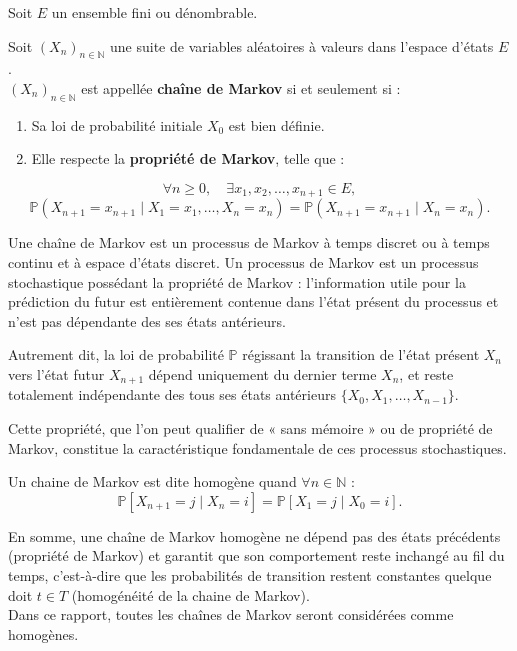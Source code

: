 \documentclass{article}
\begin{document}
\begin{tcolorbox}[colback=white,colframe=red!80!black,title=Chaîne de Markov]
Soit $E$ un ensemble fini ou dénombrable.

Soit $(X_n)_{n \in \mathbb{N}}$ une suite de variables aléatoires à valeurs dans l'espace d'états $E$. \\

$(X_n)_{n \in \mathbb{N}}$ est appellée \textbf{chaîne de Markov} si et seulement si :
\begin{enumerate}[leftmargin=5em, label=(\arabic*)]
    \item Sa loi de probabilité initiale $X_0$ est bien définie.
    \item Elle respecte la \textbf{propriété de Markov}, telle que :
\end{enumerate}
\[
\forall n \geq 0, \quad \exists x_1, x_2, \dots, x_{n+1} \in E,
\]
\[
\mathbb{P}(X_{n+1} = x_{n+1} \mid X_1 = x_1, \dots, X_n = x_n) = \mathbb{P}(X_{n+1} = x_{n+1} \mid X_n = x_n).
\]
\end{tcolorbox}

Une chaîne de Markov est un processus de Markov à temps discret ou à temps continu et à espace d'états discret. Un processus de Markov est un processus stochastique possédant la propriété de Markov : l'information utile pour la prédiction du futur est entièrement contenue dans l'état présent du processus et n'est pas dépendante des ses états antérieurs.

Autrement dit, la loi de probabilité $\mathbb{P}$ régissant la transition de l'état présent $X_n$ vers l'état futur $X_{n+1}$ dépend uniquement du dernier terme $X_n$, et reste totalement indépendante des tous ses états antérieurs $\{X_0, X_1, \dots, X_{n-1}\}$.

Cette propriété, que l'on peut qualifier de « sans mémoire » ou de propriété de Markov, constitue la caractéristique fondamentale de ces processus stochastiques.

\begin{tcolorbox}[colback=white,colframe=blue!80!black,title=Chaine de Markov Homogène]
Un chaine de Markov est dite homogène quand $\forall n \in \mathbb{N}$ :
\[
  \mathbb{P}[X_{n+1} = j \mid X_n = i] = \mathbb{P}[X_1 = j \mid X_0 = i].
\]
\end{tcolorbox}

En somme, une chaîne de Markov homogène ne dépend pas des états précédents (propriété de Markov) et garantit que son comportement reste inchangé au fil du temps, c'est-à-dire que les probabilités de transition restent constantes quelque doit $t \in T$ (homogénéité de la chaine de Markov). \\
Dans ce rapport, toutes les chaînes de Markov seront considérées comme homogènes.
\end{document}
